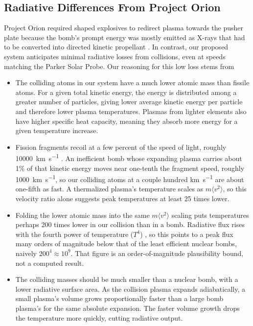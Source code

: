 \documentclass{article}
\begin{document}
\subsection{Radiative Differences From Project Orion}\label{sec:radiative_differences}
Project Orion required shaped explosives to redirect plasma towards the pusher plate because the bomb's prompt energy was mostly emitted as X-rays that had to be converted into directed kinetic propellant \cite{balcomb1970nuclear}.  In contrast, our proposed system anticipates minimal radiative losses from collisions, even at speeds matching the Parker Solar Probe. Our reasoning for this low loss stems from
\begin{itemize}
    \item The colliding atoms in our system have a much lower atomic mass than fissile atoms. For a given total kinetic energy, the energy is distributed among a greater number of particles, giving lower average kinetic energy per particle and therefore lower plasma temperatures. Plasmas from lighter elements also have higher specific heat capacity, meaning they absorb more energy for a given temperature increase. 
    \item Fission fragments recoil at a few percent of the speed of light, roughly \SI{10000}{\kilo\meter\per\second} \cite{krane1988nuclear}. An inefficient bomb whose expanding plasma carries about 1\% of that kinetic energy moves near one-tenth the fragment speed, roughly \SI{1000}{\kilo\meter\per\second}, so our colliding atoms at a couple hundred \si{\kilo\meter\per\second} are about one-fifth as fast. A thermalized plasma's temperature scales as $m\langle v^2\rangle$, so this velocity ratio alone suggests peak temperatures at least 25 times lower.
    \item Folding the lower atomic mass into the same $m\langle v^2\rangle$ scaling puts temperatures perhaps 200 times lower in our collision than in a bomb. Radiative flux rises with the fourth power of temperature ($T^4$) \cite{incropera_heat_transfer}, so this points to a peak flux many orders of magnitude below that of the least efficient nuclear bombs, naively $200^4 \approx 10^9$. That figure is an order-of-magnitude plausibility bound, not a computed result.
    \item The colliding masses should be much smaller than a nuclear bomb, with a lower radiative surface area.   As the collision plasma expands adiabatically, a small plasma's volume grows proportionally faster than a large bomb plasma's for the same absolute expansion. The faster volume growth drops the temperature more quickly, cutting radiative output.
\end{itemize}
\end{document}
